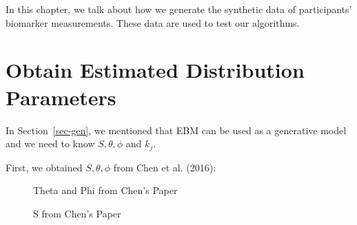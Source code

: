 \documentclass[
  letterpaper,
  DIV=11,
  numbers=noendperiod]{scrreprt}
\begin{document}
In this chapter, we talk about how we generate the synthetic data of
participants' biomarker measurements. These data are used to test our
algorithms.

\section{Obtain Estimated Distribution
Parameters}\label{obtain-estimated-distribution-parameters}

In Section~\ref{sec-gen}, we mentioned that EBM can be used as a
generative model and we need to know \(S, \theta, \phi\) and \(k_j\).

First, we obtained \(S, \theta, \phi\) from Chen et al. (2016):

\begin{figure}


\caption{\label{fig-chen1}Theta and Phi from Chen's Paper}

\end{figure}%

\begin{figure}


\caption{\label{fig-chen2}S from Chen's Paper}

\end{figure}%
\end{document}
